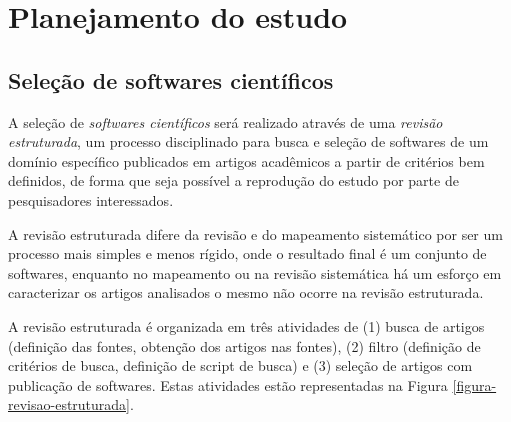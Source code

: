 \section{Planejamento do estudo}

% 
%
%

\subsection{Seleção de softwares científicos}

A seleção de {\it softwares científicos} será realizado através de uma {\it
revisão estruturada}, um processo disciplinado para busca e seleção de
softwares de um domínio específico publicados em artigos acadêmicos a partir de
critérios bem definidos, de forma que seja possível a reprodução do estudo por
parte de pesquisadores interessados.

A revisão estruturada difere da revisão e do mapeamento sistemático por ser um
processo mais simples e menos rígido, onde o resultado final é um conjunto de
softwares, enquanto no mapeamento ou na revisão sistemática há um esforço em
caracterizar os artigos analisados o mesmo não ocorre na revisão estruturada.

A revisão estruturada é organizada em três atividades de (1) busca de artigos
(definição das fontes, obtenção dos artigos nas fontes), (2) filtro (definição
de critérios de busca, definição de script de busca) e (3) seleção de artigos
com publicação de softwares. Estas atividades estão representadas na Figura
\ref{figura-revisao-estruturada}.

